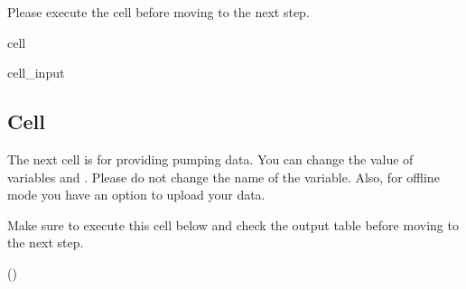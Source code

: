 \documentclass[letterpaper,10pt,english]{jupyterBook}
\begin{document}
\sphinxAtStartPar
Please execute the cell before moving to the next step.

\begin{sphinxuseclass}{cell}\begin{sphinxVerbatimInput}

\begin{sphinxuseclass}{cell_input}
\begin{sphinxVerbatim}[commandchars=\\\{\}]
   
   
   

      
    
\end{sphinxVerbatim}

\end{sphinxuseclass}\end{sphinxVerbatimInput}

\end{sphinxuseclass}

\subsection{ Cell}
\label{\detokenize{content/tools/type_curve_fit:input-data-cell}}
\sphinxAtStartPar
The next cell is for providing pumping data. You can change the value of variables  and . Please do not change the name of the variable. Also, for offline mode \sphinxhyphen{} you have an option to upload your  data.

\sphinxAtStartPar
Make sure to execute this cell below and check the output table before moving to the next step.

\sphinxAtStartPar
()
\end{document}
